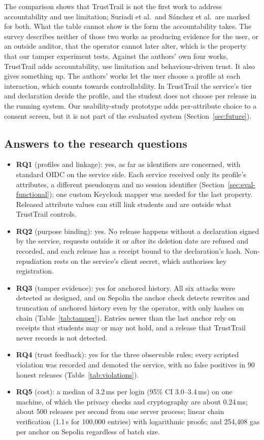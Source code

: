 The comparison shows that TrustTrail is not the first work to address accountability and use limitation; Suriadi et al.\ and Sánchez et al.\ are marked for both. What the table cannot show is the form the accountability takes. The survey describes neither of those two works as producing evidence for the user, or an outside auditor, that the operator cannot later alter, which is the property that our tamper experiment tests. Against the authors' own four works, TrustTrail adds accountability, use limitation and behaviour-driven trust. It also gives something up. The authors' works let the user choose a profile at each interaction, which counts towards controllability. In TrustTrail the service's tier and declaration decide the profile, and the student does not choose per release in the running system. Our usability-study prototype adds per-attribute choice to a consent screen, but it is not part of the evaluated system (Section~\ref{sec:future}).

\subsection{Answers to the research questions}
\begin{itemize}
\item \textbf{RQ1} (profiles and linkage): yes, as far as identifiers are concerned, with standard OIDC on the service side. Each service received only its profile's attributes, a different pseudonym and no session identifier (Section~\ref{sec:eval-functional}); one custom Keycloak mapper was needed for the last property. Released attribute values can still link students and are outside what TrustTrail controls.
\item \textbf{RQ2} (purpose binding): yes. No release happens without a declaration signed by the service, requests outside it or after its deletion date are refused and recorded, and each release has a receipt bound to the declaration's hash. Non-repudiation rests on the service's client secret, which authorises key registration.
\item \textbf{RQ3} (tamper evidence): yes for anchored history. All six attacks were detected as designed, and on Sepolia the anchor check detects rewrites and truncation of anchored history even by the operator, with only hashes on chain (Table~\ref{tab:tamper}). Entries newer than the last anchor rely on receipts that students may or may not hold, and a release that TrustTrail never records is not detected.
\item \textbf{RQ4} (trust feedback): yes for the three observable rules; every scripted violation was recorded and demoted the service, with no false positives in 90 honest releases (Table~\ref{tab:violations}).
\item \textbf{RQ5} (cost): a median of 3.2\,ms per login (95\% CI 3.0--3.4\,ms) on one machine, of which the privacy checks and cryptography are about 0.24\,ms; about 500 releases per second from one server process; linear chain verification (1.1\,s for 100{,}000 entries) with logarithmic proofs; and 254{,}408 gas per anchor on Sepolia regardless of batch size.
\end{itemize}


